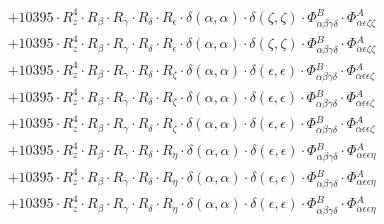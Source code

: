 \documentclass{article}
\begin{document}
\begin{subequations}
\begin{gather}
\begin{array}{c}
 \\[0.2em] 		 + 10395 \cdot R_{z}^{4} \cdot R_{\beta{}} \cdot R_{\gamma{}} \cdot R_{\delta{}} \cdot R_{\epsilon{}} \cdot \delta{}\left(\alpha{}, \alpha{}\right) \cdot \delta{}\left(\zeta{}, \zeta{}\right) \cdot \Phi{}^{B}_{\alpha{}\beta{}\gamma{}\delta{}} \cdot \Phi{}^{A}_{\alpha{}\epsilon{}\zeta{}\zeta{}} 
 \\[0.2em] 		 + 10395 \cdot R_{z}^{4} \cdot R_{\beta{}} \cdot R_{\gamma{}} \cdot R_{\delta{}} \cdot R_{\epsilon{}} \cdot \delta{}\left(\alpha{}, \alpha{}\right) \cdot \delta{}\left(\zeta{}, \zeta{}\right) \cdot \Phi{}^{B}_{\alpha{}\beta{}\gamma{}\delta{}} \cdot \Phi{}^{A}_{\alpha{}\epsilon{}\zeta{}\zeta{}} 
 \\[0.2em] 		 + 10395 \cdot R_{z}^{4} \cdot R_{\beta{}} \cdot R_{\gamma{}} \cdot R_{\delta{}} \cdot R_{\zeta{}} \cdot \delta{}\left(\alpha{}, \alpha{}\right) \cdot \delta{}\left(\epsilon{}, \epsilon{}\right) \cdot \Phi{}^{B}_{\alpha{}\beta{}\gamma{}\delta{}} \cdot \Phi{}^{A}_{\alpha{}\epsilon{}\epsilon{}\zeta{}} 
 \\[0.2em] 		 + 10395 \cdot R_{z}^{4} \cdot R_{\beta{}} \cdot R_{\gamma{}} \cdot R_{\delta{}} \cdot R_{\zeta{}} \cdot \delta{}\left(\alpha{}, \alpha{}\right) \cdot \delta{}\left(\epsilon{}, \epsilon{}\right) \cdot \Phi{}^{B}_{\alpha{}\beta{}\gamma{}\delta{}} \cdot \Phi{}^{A}_{\alpha{}\epsilon{}\epsilon{}\zeta{}} 
 \\[0.2em] 		 + 10395 \cdot R_{z}^{4} \cdot R_{\beta{}} \cdot R_{\gamma{}} \cdot R_{\delta{}} \cdot R_{\zeta{}} \cdot \delta{}\left(\alpha{}, \alpha{}\right) \cdot \delta{}\left(\epsilon{}, \epsilon{}\right) \cdot \Phi{}^{B}_{\alpha{}\beta{}\gamma{}\delta{}} \cdot \Phi{}^{A}_{\alpha{}\epsilon{}\epsilon{}\zeta{}} 
 \\[0.2em] 		 + 10395 \cdot R_{z}^{4} \cdot R_{\beta{}} \cdot R_{\gamma{}} \cdot R_{\delta{}} \cdot R_{\eta{}} \cdot \delta{}\left(\alpha{}, \alpha{}\right) \cdot \delta{}\left(\epsilon{}, \epsilon{}\right) \cdot \Phi{}^{B}_{\alpha{}\beta{}\gamma{}\delta{}} \cdot \Phi{}^{A}_{\alpha{}\epsilon{}\epsilon{}\eta{}} 
 \\[0.2em] 		 + 10395 \cdot R_{z}^{4} \cdot R_{\beta{}} \cdot R_{\gamma{}} \cdot R_{\delta{}} \cdot R_{\eta{}} \cdot \delta{}\left(\alpha{}, \alpha{}\right) \cdot \delta{}\left(\epsilon{}, \epsilon{}\right) \cdot \Phi{}^{B}_{\alpha{}\beta{}\gamma{}\delta{}} \cdot \Phi{}^{A}_{\alpha{}\epsilon{}\epsilon{}\eta{}} 
 \\[0.2em] 		 + 10395 \cdot R_{z}^{4} \cdot R_{\beta{}} \cdot R_{\gamma{}} \cdot R_{\delta{}} \cdot R_{\eta{}} \cdot \delta{}\left(\alpha{}, \alpha{}\right) \cdot \delta{}\left(\epsilon{}, \epsilon{}\right) \cdot \Phi{}^{B}_{\alpha{}\beta{}\gamma{}\delta{}} \cdot \Phi{}^{A}_{\alpha{}\epsilon{}\epsilon{}\eta{}} 

\end{array}
\end{gather}
\end{subequations}
\end{document}
